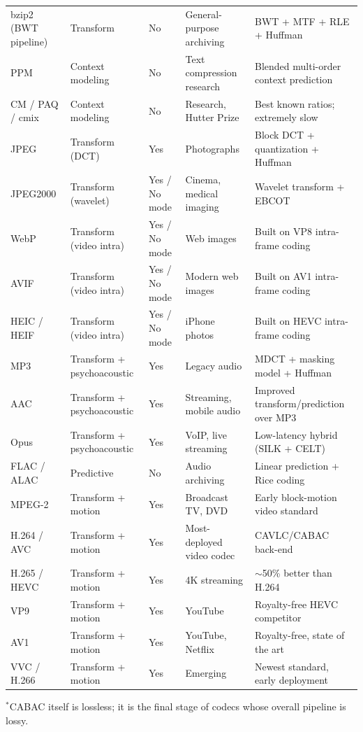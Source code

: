 \documentclass[11pt]{article}
\begin{document}
\begin{longtable}{@{}L{3.0cm}L{2.6cm}L{1.4cm}L{4.0cm}L{4.0cm}@{}}
bzip2 (BWT pipeline) & Transform & No & General-purpose archiving & BWT + MTF + RLE + Huffman \\
PPM & Context modeling & No & Text compression research & Blended multi-order context prediction \\
CM / PAQ / cmix & Context modeling & No & Research, Hutter Prize & Best known ratios; extremely slow \\
JPEG & Transform (DCT) & Yes & Photographs & Block DCT + quantization + Huffman \\
JPEG2000 & Transform (wavelet) & Yes / No mode & Cinema, medical imaging & Wavelet transform + EBCOT \\
WebP & Transform (video intra) & Yes / No mode & Web images & Built on VP8 intra-frame coding \\
AVIF & Transform (video intra) & Yes / No mode & Modern web images & Built on AV1 intra-frame coding \\
HEIC / HEIF & Transform (video intra) & Yes / No mode & iPhone photos & Built on HEVC intra-frame coding \\
MP3 & Transform + psychoacoustic & Yes & Legacy audio & MDCT + masking model + Huffman \\
AAC & Transform + psychoacoustic & Yes & Streaming, mobile audio & Improved transform/prediction over MP3 \\
Opus & Transform + psychoacoustic & Yes & VoIP, live streaming & Low-latency hybrid (SILK + CELT) \\
FLAC / ALAC & Predictive & No & Audio archiving & Linear prediction + Rice coding \\
MPEG-2 & Transform + motion & Yes & Broadcast TV, DVD & Early block-motion video standard \\
H.264 / AVC & Transform + motion & Yes & Most-deployed video codec & CAVLC/CABAC back-end \\
H.265 / HEVC & Transform + motion & Yes & 4K streaming & $\sim$50\% better than H.264 \\
VP9 & Transform + motion & Yes & YouTube & Royalty-free HEVC competitor \\
AV1 & Transform + motion & Yes & YouTube, Netflix & Royalty-free, state of the art \\
VVC / H.266 & Transform + motion & Yes & Emerging & Newest standard, early deployment \\
\bottomrule
\end{longtable}
\noindent\footnotesize $^{*}$CABAC itself is lossless; it is the final stage of codecs whose overall pipeline is lossy.\normalsize
\end{document}
